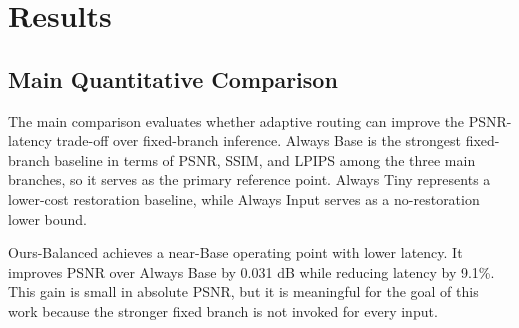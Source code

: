 \documentclass[11pt]{article}
\begin{document}
\section{Results}

\subsection{Main Quantitative Comparison}

The main comparison evaluates whether adaptive routing can improve the PSNR-latency trade-off over fixed-branch inference.
Always Base is the strongest fixed-branch baseline in terms of PSNR, SSIM, and LPIPS among the three main branches, so it serves as the primary reference point.
Always Tiny represents a lower-cost restoration baseline, while Always Input serves as a no-restoration lower bound.

\begin{table}[t]
\centering
\caption{Main comparison on the official validation set. Latency is measured as component-based pipeline latency, not pure forward micro-benchmark latency. Relative latency reduction is computed with respect to Always Base, which serves as the strongest fixed-branch baseline.}
\label{tab:main}
\end{table}

Ours-Balanced achieves a near-Base operating point with lower latency.
It improves PSNR over Always Base by 0.031 dB while reducing latency by 9.1\%.
This gain is small in absolute PSNR, but it is meaningful for the goal of this work because the stronger fixed branch is not invoked for every input.
\end{document}
